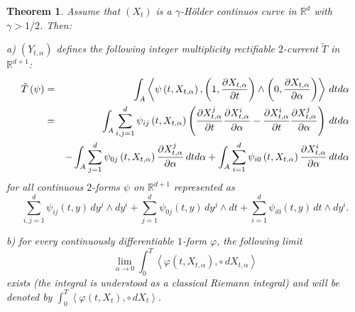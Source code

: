 \documentclass{article}
\newtheorem{theorem}{Theorem}
\begin{document}
\begin{theorem}
Assume that $\left( X_{t}\right) $ is a $\gamma $-H\"{o}lder continuos curve
in $\mathbb{R}^{d}$ with $\gamma >1/2$. Then:

a) $\left( Y_{t,\alpha }\right) $ defines the following integer multiplicity
rectifiable $2$-current $\tilde{T}$ in $\mathbb{R}^{d+1}$: 
\begin{eqnarray*}
\tilde{T}\left( \psi \right)  &=&\int_{A}\left\langle \psi \left(
t,X_{t,\alpha }\right) ,\left( 1,\frac{\partial X_{t,\alpha }}{\partial t}%
\right) \wedge \left( 0,\frac{\partial X_{t,\alpha }}{\partial \alpha }%
\right) \right\rangle \,dtd\alpha  \\
&=&\int_{A}\sum_{i,j=1}^{d}\psi _{ij}\left( t,X_{t,\alpha }\right) \left( 
\frac{\partial X_{t,\alpha }^{j}}{\partial t}\frac{\partial X_{t,\alpha }^{i}%
}{\partial \alpha }-\frac{\partial X_{t,\alpha }^{i}}{\partial t}\frac{%
\partial X_{t,\alpha }^{j}}{\partial \alpha }\right) \,dtd\alpha  \\
&&-\int_{A}\sum_{j=1}^{d}\psi _{0j}\left( t,X_{t,\alpha }\right) \frac{%
\partial X_{t,\alpha }^{j}}{\partial \alpha }\,dtd\alpha
+\int_{A}\sum_{i=1}^{d}\psi _{i0}\left( t,X_{t,\alpha }\right) \frac{%
\partial X_{t,\alpha }^{i}}{\partial \alpha }\,dtd\alpha 
\end{eqnarray*}
for all continuous $2$-forms $\psi $ on $\mathbb{R}^{d+1}$ represented as 
\begin{equation*}
\sum_{i,j=1}^{d}\psi _{ij}\left( t,y\right) \,dy^{j}\wedge
dy^{i}+\sum_{j=1}^{d}\psi _{0j}\left( t,y\right) \,dy^{j}\wedge
dt+\sum_{i=1}^{d}\psi _{i0}\left( t,y\right) \,dt\wedge dy^{i}.
\end{equation*}

b) for every continuously differentiable $1$-form $\varphi $, the following
limit 
\begin{equation*}
\lim_{\alpha \rightarrow 0}\int_{0}^{T}\left\langle \varphi \left(
t,X_{t,\alpha }\right) ,\circ \,dX_{t,\alpha }\right\rangle 
\end{equation*}
exists (the integral is understood as a classical Riemann integral) and will
be denoted by $\int_{0}^{T}\left\langle \varphi \left( t,X_{t}\right) ,\circ
\,dX_{t}\right\rangle $.


\end{theorem}
\end{document}

